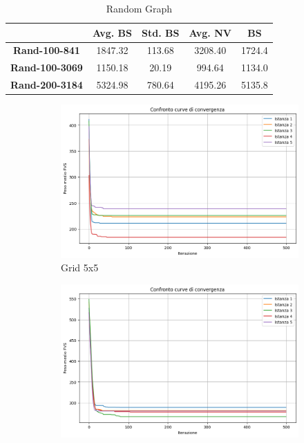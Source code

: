 \documentclass[a4paper, 10pt]{article}
\begin{document}
\begin{table}[H]
\centering
\label{tab:random_graph}
\begin{tabular}{|c|c|c|c|c|} %
\hline
 & \textbf{Avg. BS} & \textbf{Std. BS} & \textbf{Avg. NV} & \textbf{BS} \\ \hline
\textbf{Rand-100-841} & 1847.32 & 113.68 & 3208.40 & 1724.4\\ \hline
\textbf{Rand-100-3069} & 1150.18 & 20.19 & 994.64 & 1134.0\\ \hline
\textbf{Rand-200-3184} & 5324.98 & 780.64 & 4195.26 & 5135.8 \\ \hline
\end{tabular}
\caption{Random Graph} 
\end{table}

\begin{figure}[H]
\centering
\begin{subfigure}[t]{0.45\textwidth}
\centering
\includegraphics[width=\linewidth]{./img/grid_5_5.png}
\caption{Grid 5x5}
\label{fig:grid1}
\end{subfigure}
\hfill
\begin{subfigure}[t]{0.45\textwidth}
\centering
\includegraphics[width=\linewidth]{./img/grid_7_7.png}

\end{subfigure}
\end{figure}
\end{document}
